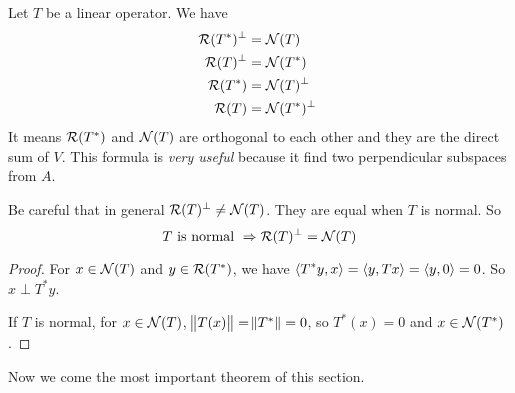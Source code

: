 \begin{theorem}
    Let $T$ be a linear operator. We have
    \begin{equation}
        \begin{aligned}
            \mathcal{R}(T^*)^\perp &= \mathcal{N}(T) \\
            \mathcal{R}(T)^\perp &= \mathcal{N}(T^*) \\
            \mathcal{R}(T^*) &= \mathcal{N}(T)^\perp \\
            \mathcal{R}(T) &= \mathcal{N}(T^*)^\perp \
        \end{aligned}        
    \end{equation}
    It means $\mathcal{R}(T^*)$ and $\mathcal{N}(T)$ are orthogonal to each other and they are the direct sum of $V$. This formula is \emph{very useful} because it find two perpendicular subspaces from $A$.
    
    Be careful that in general $\mathcal{R}(T)^\perp \neq \mathcal{N}(T)$. They are equal when $T$ is normal. So
    \begin{equation}
        T \text{ is normal } \Rightarrow \mathcal{R}(T)^\perp = \mathcal{N}(T)
    \end{equation}    
\end{theorem}
\begin{proof}
    For $x \in \mathcal{N}(T)$ and $y \in \mathcal{R}(T^*)$, we have $\left\langle \displaystyle T^*y, x \right\rangle = \left\langle \displaystyle y, Tx \right\rangle = \left\langle \displaystyle y, 0 \right\rangle = 0$. So $x \perp T^* y$.
    
    
    If $T$ is normal, for $x \in \mathcal{N}(T)$, $\norm{T(x)} = \norm{T^*} = 0$, so $T^*(x) = 0$ and $x \in \mathcal{N}(T^*)$.
\end{proof}


Now we come the most important theorem of this section.

